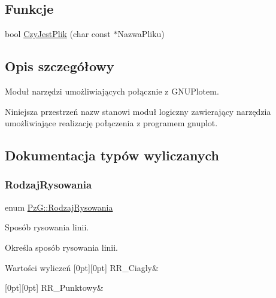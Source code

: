 \subsection*{Funkcje}
\begin{DoxyCompactItemize}
\item 
bool \hyperlink{namespace_pz_g_ae1ae4d36f66c77879380ba73da8e20e3}{Czy\+Jest\+Plik} (char const $\ast$Nazwa\+Pliku)
\end{DoxyCompactItemize}


\subsection{Opis szczegółowy}
Moduł narzędzi umożliwiających połącznie z G\+N\+U\+Plotem. 

Niniejsza przestrzeń nazw stanowi moduł logiczny zawierający narzędzia umożliwiające realizację połączenia z programem {\ttfamily gnuplot}. 

\subsection{Dokumentacja typów wyliczanych}
\mbox{\label{namespace_pz_g_a705c92106f39b7d0c34a6739d10ff0b6}} 
\subsubsection{\texorpdfstring{Rodzaj\+Rysowania}{RodzajRysowania}}
{\footnotesize\ttfamily enum \hyperlink{namespace_pz_g_a705c92106f39b7d0c34a6739d10ff0b6}{Pz\+G\+::\+Rodzaj\+Rysowania}}



Sposób rysowania linii. 

Określa sposób rysowania linii. \begin{DoxyEnumFields}{Wartości wyliczeń}
[0pt][0pt]{}\mbox{\label{namespace_pz_g_a705c92106f39b7d0c34a6739d10ff0b6a927eaa159aa4bd3198f0a330b967746d}} 
R\+R\+\_\+\+Ciagly&\\
\hline

[0pt][0pt]{}\mbox{\label{namespace_pz_g_a705c92106f39b7d0c34a6739d10ff0b6aa01097ee8266d6402b752ef6f9a4690c}} 
R\+R\+\_\+\+Punktowy&\\
\hline

\end{DoxyEnumFields}


